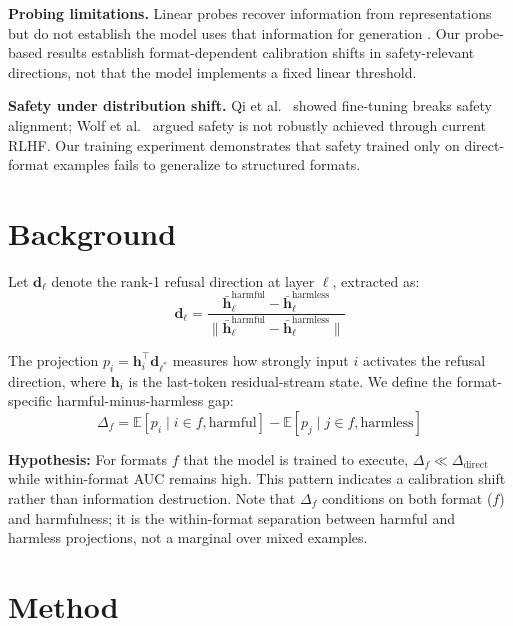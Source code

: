 \documentclass[conference]{IEEEtran}
\begin{document}
\textbf{Probing limitations.} Linear probes recover information from representations but do not establish the model uses that information for generation \cite{belinkov2022probing, hewitt2019designing}. Our probe-based results establish format-dependent calibration shifts in safety-relevant directions, not that the model implements a fixed linear threshold.

\textbf{Safety under distribution shift.} Qi et al.\ \cite{qi2023fine} showed fine-tuning breaks safety alignment; Wolf et al.\ \cite{wolf2023fundamental} argued safety is not robustly achieved through current RLHF. Our training experiment demonstrates that safety trained only on direct-format examples fails to generalize to structured formats.

\section{Background}
\label{sec:hypothesis}

Let $\mathbf{d}_\ell$ denote the rank-1 refusal direction at layer $\ell$, extracted as:
\begin{equation}
\mathbf{d}_\ell = \frac{\bar{\mathbf{h}}_\ell^{\text{harmful}} - \bar{\mathbf{h}}_\ell^{\text{harmless}}}{\|\bar{\mathbf{h}}_\ell^{\text{harmful}} - \bar{\mathbf{h}}_\ell^{\text{harmless}}\|}
\end{equation}

The projection $p_i = \mathbf{h}_i^\top \mathbf{d}_{\ell^*}$ measures how strongly input $i$ activates the refusal direction, where $\mathbf{h}_i$ is the last-token residual-stream state. We define the format-specific harmful-minus-harmless gap:
\begin{equation}
\Delta_f = \mathbb{E}[p_i \mid i \in f, \text{harmful}] - \mathbb{E}[p_j \mid j \in f, \text{harmless}]
\end{equation}

\textbf{Hypothesis:} For formats $f$ that the model is trained to execute, $\Delta_f \ll \Delta_{\text{direct}}$ while within-format AUC remains high. This pattern indicates a calibration shift rather than information destruction. Note that $\Delta_f$ conditions on both format ($f$) and harmfulness; it is the within-format separation between harmful and harmless projections, not a marginal over mixed examples.

\section{Method}
\label{sec:method}
\end{document}
